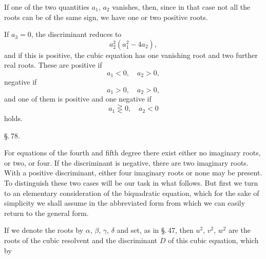 
If one of the two quantities $a_1$, $a_2$ vanishes, then, since in that case not all the roots can be of the same sign, we have one or two positive roots.

If $a_3 = 0$, the discriminant reduces to
\[
a_2^2(a_1^2 - 4a_2),
\]
and if this is positive, the cubic equation has one vanishing root and two further real roots. These are positive if
\[
a_1 < 0, \quad a_2 > 0,
\]
negative if
\[
a_1 > 0, \quad a_2 > 0,
\]
and one of them is positive and one negative if
\[
a_1 \gtreqless 0, \quad a_2 < 0
\]
holds.

\begin{center}
\S.\,78.

\end{center}

For equations of the fourth and fifth degree there exist either no imaginary roots, or two, or four. If the discriminant is negative, there are two imaginary roots. With a positive discriminant, either four imaginary roots or none may be present. To distinguish these two cases will be our task in what follows. But first we turn to an elementary consideration of the biquadratic equation, which for the sake of simplicity we shall assume in the abbreviated form
from which we can easily return to the general form.

If we denote the roots by $\alpha$, $\beta$, $\gamma$, $\delta$ and set, as in \S.\,47,
then $u^2$, $v^2$, $w^2$ are the roots of the cubic resolvent
and the discriminant $D$ of this cubic equation, which by
